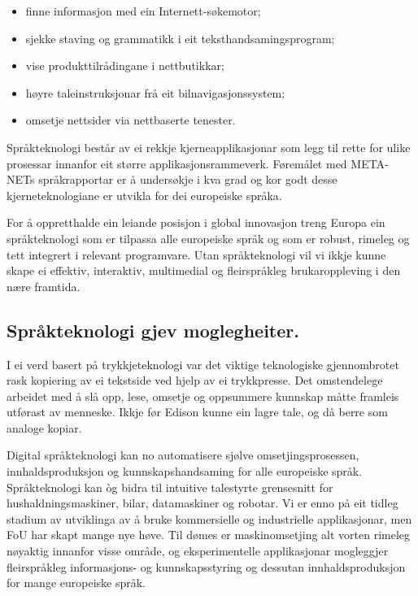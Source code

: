 \begin{multicols}{2}
\begin{itemize}
\item finne informasjon med ein Internett-søkemotor; 
\item sjekke staving og grammatikk i eit teksthandsamingsprogram; 
\item vise produkttilrådingane i nettbutikkar; 
\item høyre taleinstruksjonar frå eit bilnavigasjonssystem; 
\item omsetje nettsider via nettbaserte tenester. 
\end{itemize}

Språkteknologi består av ei rekkje kjerneapplikasjonar som legg til rette for ulike prosessar innanfor eit større applikasjonsrammeverk. Føremålet med META-NETs språkrapportar er å undersøkje i kva grad og kor godt desse kjerneteknologiane er utvikla for dei europeiske språka. 


For å oppretthalde ein leiande posisjon i global innovasjon treng Europa ein språkteknologi som er tilpassa alle europeiske språk og som er robust, rimeleg og tett integrert i relevant programvare. Utan språkteknologi vil vi ikkje kunne skape ei effektiv, interaktiv, multimedial og fleirspråkleg brukaroppleving i den nære framtida.

\subsection{Språkteknologi gjev moglegheiter.}

I ei verd basert på trykkjeteknologi var det viktige teknologiske gjennombrotet rask kopiering av ei tekstside ved hjelp av ei trykkpresse. Det omstendelege arbeidet med å slå opp, lese, omsetje og oppsummere kunnskap måtte framleis utførast av menneske. Ikkje før Edison kunne ein lagre tale, og då berre som analoge kopiar. 

Digital språkteknologi kan no automatisere sjølve omsetjingsprosessen, innhaldsproduksjon og kunnskapshandsaming for alle europeiske språk. Språkteknologi kan òg bidra til intuitive talestyrte grensesnitt for hushaldningsmaskiner, bilar, datamaskiner og robotar. Vi er enno på eit tidleg stadium av utviklinga av å bruke kommersielle og industrielle applikasjonar, men FoU har skapt mange nye høve. Til dømes er maskinomsetjing alt vorten rimeleg nøyaktig innanfor visse område, og eksperimentelle applikasjonar mogleggjer fleirspråkleg informasjons- og kunnskapsstyring og dessutan innhaldsproduksjon for mange europeiske språk. 


\end{multicols}
